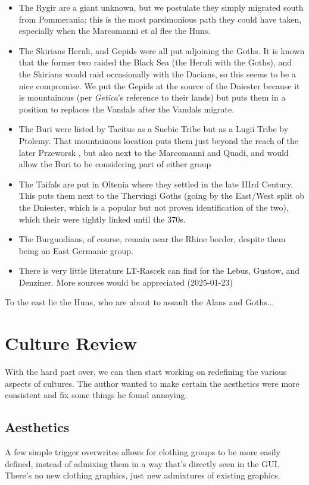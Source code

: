 \documentclass{article}
\begin{document}
	\begin{itemize}
		\item The Rygir are a giant unknown, but we postulate they simply migrated south from Pommerania; this is the most parsimonious path they could have taken, especially when the Marcomanni et al flee the Huns.
		\item The Skirians Heruli, and Gepids were all put adjoining the Goths.
		It is known that the former two raided the Black Sea (the Heruli with the Goths), and the Skirians would raid occasionally with the Dacians, so this seems to be a nice compromise.
		We put the Gepids at the source of the Dniester because it is mountainous (per \textit{Getica}'s reference to their lands) but puts them in a position to replaces the Vandals after the Vandals migrate.
		\item The Buri were listed by Tacitus as a Suebic Tribe but as a Lugii Tribe by Ptolemy.
		That mountainous location puts them just beyond the reach of the later Przeworsk \cite{HeatherEmpiresAndBarbarians,PrzeworskHistory}, but also next to the Marcomanni and Quadi, and would allow the Buri to be considering part of either group
		\item The Taifals are put in Oltenia where they settled in the late IIIrd Century.
		This puts them next to the Thervingi Goths (going by the East/West split ob the Dniester, which is a popular but not proven identification of the two), which their were tightly linked until the 370s.
		\item The Burgundians, of course, remain near the Rhine border, despite them being an East Germanic group.
		\item There is very little literature LT-Rascek can find for the Lebus, Gustow, and Denziner.
		More sources would be appreciated (2025-01-23)
	\end{itemize}
	
	To the east lie the Huns, who are about to assault the Alans and Goths...
	
	\section{Culture Review}
	\label{sec:culture_review}
	
	With the hard part over, we can then start working on redefining the various aspects of cultures. The author wanted to make certain the aesthetics were more consistent and fix some things he found annoying.
	
	\subsection{Aesthetics}
	\label{sec:culture_review:subsec:aesthetics}
	A few simple trigger overwrites allows for clothing groups to be more easily defined, instead of admixing them in a way that’s directly seen in the GUI. There’s no new clothing graphics, just new admixtures of existing graphics.
	
\end{document}

